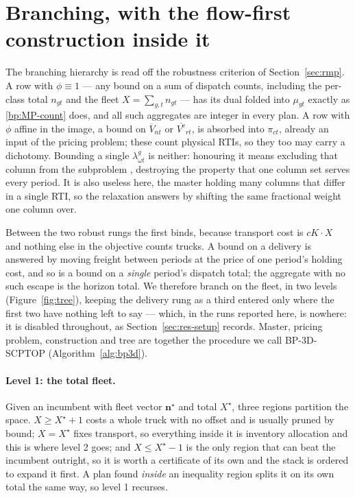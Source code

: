 \section{Branching, with the flow-first construction inside it}
\label{sec:branching}

The branching hierarchy is read off the robustness criterion of
Section~\ref{sec:rmp}. A row with $\phi\equiv1$ --- any bound on a sum of
dispatch counts, including the per-class total $n_{gt}$ and the fleet
$X=\sum_{g,t}n_{gt}$ --- has its dual folded into $\mu_{gt}$ exactly as
\eqref{bp:MP-count} does, and all such aggregates are integer in every
plan. A row with $\phi$ affine in the image, a bound on
$\overline{V}_{nt}$ or $\overline{V^{\mathrm{e}}}_{rt}$, is absorbed
into $\pi_{ct}$, already an input of the pricing problem; these count
physical RTIs, so they too may carry a dichotomy. Bounding a single
$\lambda^{g}_{\omega t}$ is neither: honouring it means excluding that
column from the subproblem
\autocite{Vanderbeck2000OnIntegerProgramming}, destroying the property
that one column set serves every period. It is also useless here, the
master holding many columns that differ in a single RTI, so the
relaxation answers by shifting the same fractional weight one column
over.

Between the two robust rungs the first binds, because transport cost
is $cK\cdot X$ and nothing else in the objective counts trucks. A bound
on a delivery is answered by moving freight between periods at the
price of one period's holding cost, and so is a bound on a
\emph{single} period's dispatch total; the aggregate with no such
escape is the horizon total. We therefore branch on the fleet, in two
levels (Figure~\ref{fig:tree}), keeping the delivery rung as a third
entered only where the first two have nothing left to say --- which, in
the runs reported here, is nowhere: it is disabled throughout, as
Section~\ref{sec:res-setup} records. Master,
pricing problem, construction and tree are together the procedure we
call BP-3D-SCPTOP (Algorithm~\ref{alg:bp3d}).

\paragraph{Level 1: the total fleet.}
Given an incumbent with fleet vector $\mathbf{n}^{\star}$ and total
$X^{\star}$, three regions partition the space. $X\ge X^{\star}+1$
costs a whole truck with no offset and is usually pruned by bound;
$X=X^{\star}$ fixes transport, so everything inside it is inventory
allocation and this is where level 2 goes; and $X\le X^{\star}-1$ is
the only region that can beat the incumbent outright, so it is worth a
certificate of its own and the stack is ordered to expand it first. A
plan found \emph{inside} an inequality region splits it on its own
total the same way, so level 1 recurses.

